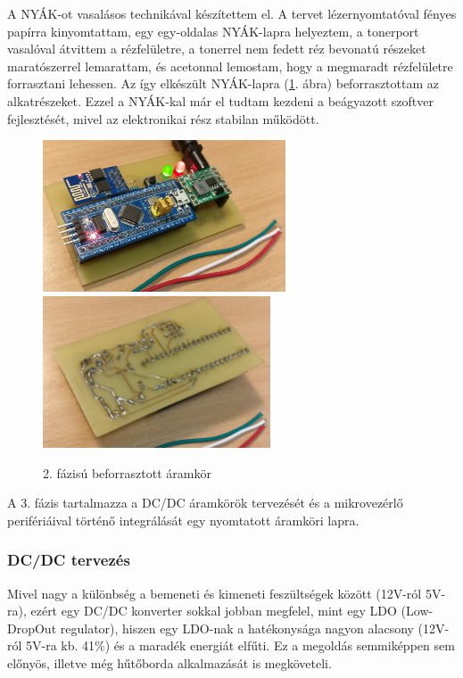 \documentclass[../main.tex]{subfiles}
\begin{document}
        A NYÁK-ot vasalásos technikával készítettem el. A tervet lézernyomtatóval fényes papírra kinyomtattam, egy egy-oldalas NYÁK-lapra helyeztem, a tonerport vasalóval átvittem a rézfelületre, a tonerrel nem fedett réz bevonatú részeket maratószerrel lemarattam, és acetonnal lemostam, hogy a megmaradt rézfelületre forrasztani lehessen. Az így elkészült NYÁK-lapra (\ref{fig:pcb_v01}. ábra) beforrasztottam az alkatrészeket. Ezzel a NYÁK-kal már el tudtam kezdeni a beágyazott szoftver fejlesztését, mivel az elektronikai rész stabilan működött.
        
        \begin{figure}[h!]
            \centering
                \includegraphics[height=4.5cm]{resources/pcb_res/pcb_v01}
                \includegraphics[height=4.5cm]{resources/pcb_res/pcb_v02}
            \caption{2. fázisú beforrasztott áramkör}
            \label{fig:pcb_v01}
        \end{figure}
        
        A 3. fázis tartalmazza a DC/DC áramkörök tervezését és a mikrovezérlő perifériáival történő integrálását egy nyomtatott áramköri lapra.
    
        
        \subsubsection{DC/DC tervezés}
            Mivel nagy a különbség a bemeneti és kimeneti feszültségek között (12V-ról 5V-ra), ezért egy DC/DC konverter sokkal jobban megfelel, mint egy LDO (Low-DropOut regulator), hiszen egy LDO-nak a hatékonysága nagyon alacsony (12V-ról 5V-ra kb. 41\%) és a maradék energiát elfűti. Ez a megoldás semmiképpen sem előnyös, illetve még hűtőborda alkalmazását is megköveteli. \cite{dcdc_1}\cite{dcdc_2}
            
\end{document}
